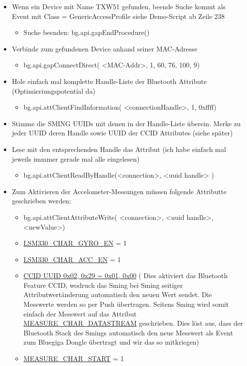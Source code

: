 \begin{itemize}
\begin{itemize}
	\item Wenn ein Device mit Name TXW51 gefunden, beende Suche kommt als Event mit Class = GenericAccessProfile siehe Demo-Script ab Zeile 238
		\begin{itemize}
			\itemsep 1pt \parskip 0pt \parsep 0pt
			\item Suche beenden: bg.api.gapEndProcedure()
		\end{itemize}
	

	\item Verbinde zum gefundenen Device anhand seiner MAC-Adresse
		\begin{itemize}
			\itemsep 1pt \parskip 0pt \parsep 0pt
			\item bg.api.gapConnectDirect( <MAC-Addr>, 1, 60, 76, 100, 9)
		\end{itemize}



	\item Hole einfach mal komplette Handle-Liste der Bluetooth Attribute (Optimieriungspotential da)
			\begin{itemize}
				\itemsep 1pt \parskip 0pt \parsep 0pt
				\item bg.api.attClientFindInformation( <connectionHandle>, 1, 0xffff)
			\end{itemize}


	\item Stimme die SMING UUIDs mit denen in der Handle-Liste überein. Merke zu jeder UUID deren Handle sowie UUID der CCID Attributes (siehe später)


	\item Lese mit den entsprechenden Handle das Attribut (ich habe einfach mal jeweils immmer gerade mal alle eingelesen)
			\begin{itemize}
				\itemsep 1pt \parskip 0pt \parsep 0pt
				\item bg.api.attClientReadByHandle(<connection>, <uuid handle> )
			\end{itemize}


	\item Zum Aktivieren der Accelometer-Messungen müssen folgende Attributte geschrieben werden:
			\begin{itemize}
				\itemsep 1pt \parskip 0pt \parsep 0pt
				\item bg.api.attClientAttributeWrite( <connection>, <uuid handle>, <newValue>)
				\item \url{LSM330_CHAR_GYRO_EN} = 1 
				\item \url{LSM330_CHAR_ACC_EN} = 1 
				\item \url{CCID UUID 0x02, 0x29 = 0x01, 0x00} ( Dies aktiviert das Bluetooth Feature CCID, wodruch das Sming bei Sming seitiger Attributwertänderung automatisch den neuen Wert sendet. Die Messwerte werden so per Push übertragen. Seitens Sming wird somit einfach der Messwert auf das Attribut \url{MEASURE_CHAR_DATASTREAM} geschrieben. Dies löst aus, dass der Bluetooth Stack des Smings automatisch den neue Messwert als Event zum Bluegiga Dongle übertragt und wir das so mitkriegen)
				\item \url{MEASURE_CHAR_START} = 1
			\end{itemize}



\end{itemize}
\end{itemize}
